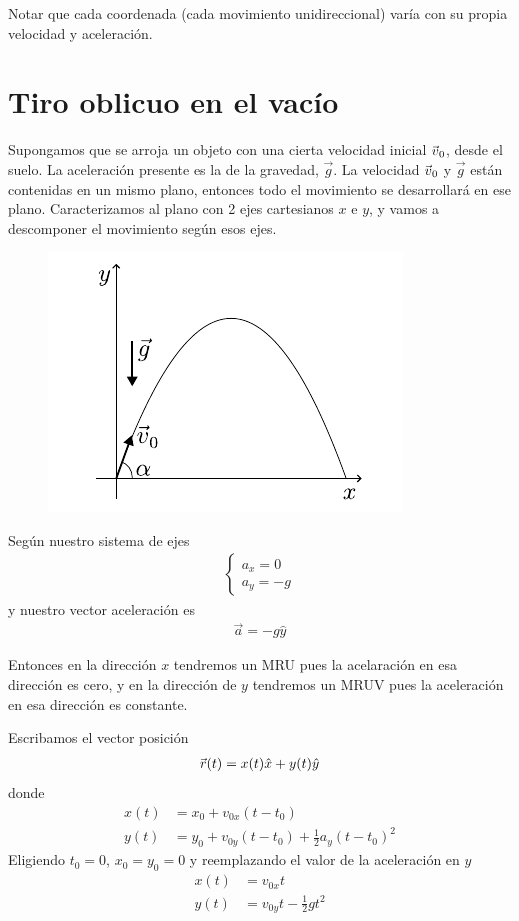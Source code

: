 Notar que cada coordenada (cada movimiento unidireccional) varía con su propia velocidad y aceleración.

\section{Tiro oblicuo en el vacío}
Supongamos que se arroja un objeto con una cierta velocidad inicial $\skew{-1}\vec{v}_0$, desde el suelo. La aceleración
 presente es la de la gravedad, $\vec{g}$. La velocidad $\skew{-1}\vec{v}_0$ y $\vec{g}$ están contenidas en un mismo 
plano, entonces todo el movimiento se desarrollará en ese plano. Caracterizamos al plano con 2 ejes cartesianos 
$x$ e $y$, y vamos a descomponer el movimiento según esos ejes.
\begin{figure}[H]
  \centering
  \includegraphics[]{images/f1-18.pdf}
  \caption{}
\end{figure}

Según nuestro sistema de ejes
\begin{align*}
  \begin{cases}
    a_x =0 \\
    a_y = -g
  \end{cases}
\end{align*}
y nuestro vector aceleración es
\begin{align*}
  \vec{a} = -g \hat{y}
\end{align*}

Entonces en la dirección $x$ tendremos un MRU pues la acelaración en esa dirección es cero, y en la dirección de $y$ 
tendremos un MRUV pues la aceleración en esa dirección es constante.

\para
Escribamos el vector posición
\begin{align*}
  \skew{-1}\vec{r}(t) = x(t)\hat{x}+ y(t)\hat{y}
\end{align*}
donde
\begin{align*}
  x(t) &= x_0 + v_{0x}(t-t_0)\\
  y(t) &= y_0 + v_{0y}(t-t_0) + \frac{1}{2}a_y (t-t_0)^2
\end{align*}
Eligiendo $t_0 = 0$, $x_0 = y_0 = 0$ y reemplazando el valor de la aceleración en $y$
\begin{align*}
  x(t) &= v_{0x}t\\
  y(t) &= v_{0y}t - \frac{1}{2}g t^2
\end{align*}


